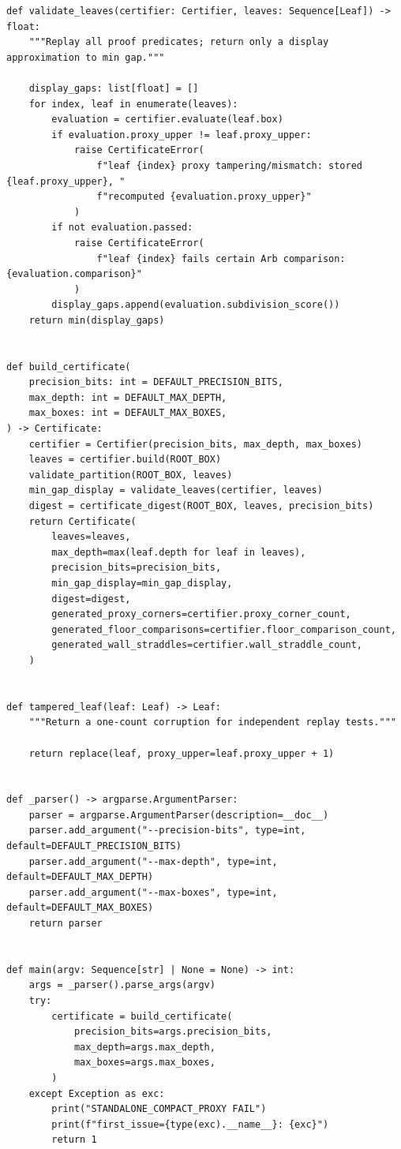 \documentclass[11pt]{article}
\numberwithin{equation}{section}
\theoremstyle{definition}
\theoremstyle{remark}
\begin{document}
\begin{lstlisting}
def validate_leaves(certifier: Certifier, leaves: Sequence[Leaf]) -> float:
    """Replay all proof predicates; return only a display approximation to min gap."""

    display_gaps: list[float] = []
    for index, leaf in enumerate(leaves):
        evaluation = certifier.evaluate(leaf.box)
        if evaluation.proxy_upper != leaf.proxy_upper:
            raise CertificateError(
                f"leaf {index} proxy tampering/mismatch: stored {leaf.proxy_upper}, "
                f"recomputed {evaluation.proxy_upper}"
            )
        if not evaluation.passed:
            raise CertificateError(
                f"leaf {index} fails certain Arb comparison: {evaluation.comparison}"
            )
        display_gaps.append(evaluation.subdivision_score())
    return min(display_gaps)


def build_certificate(
    precision_bits: int = DEFAULT_PRECISION_BITS,
    max_depth: int = DEFAULT_MAX_DEPTH,
    max_boxes: int = DEFAULT_MAX_BOXES,
) -> Certificate:
    certifier = Certifier(precision_bits, max_depth, max_boxes)
    leaves = certifier.build(ROOT_BOX)
    validate_partition(ROOT_BOX, leaves)
    min_gap_display = validate_leaves(certifier, leaves)
    digest = certificate_digest(ROOT_BOX, leaves, precision_bits)
    return Certificate(
        leaves=leaves,
        max_depth=max(leaf.depth for leaf in leaves),
        precision_bits=precision_bits,
        min_gap_display=min_gap_display,
        digest=digest,
        generated_proxy_corners=certifier.proxy_corner_count,
        generated_floor_comparisons=certifier.floor_comparison_count,
        generated_wall_straddles=certifier.wall_straddle_count,
    )


def tampered_leaf(leaf: Leaf) -> Leaf:
    """Return a one-count corruption for independent replay tests."""

    return replace(leaf, proxy_upper=leaf.proxy_upper + 1)


def _parser() -> argparse.ArgumentParser:
    parser = argparse.ArgumentParser(description=__doc__)
    parser.add_argument("--precision-bits", type=int, default=DEFAULT_PRECISION_BITS)
    parser.add_argument("--max-depth", type=int, default=DEFAULT_MAX_DEPTH)
    parser.add_argument("--max-boxes", type=int, default=DEFAULT_MAX_BOXES)
    return parser


def main(argv: Sequence[str] | None = None) -> int:
    args = _parser().parse_args(argv)
    try:
        certificate = build_certificate(
            precision_bits=args.precision_bits,
            max_depth=args.max_depth,
            max_boxes=args.max_boxes,
        )
    except Exception as exc:
        print("STANDALONE_COMPACT_PROXY FAIL")
        print(f"first_issue={type(exc).__name__}: {exc}")
        return 1


\end{lstlisting}
\end{document}
